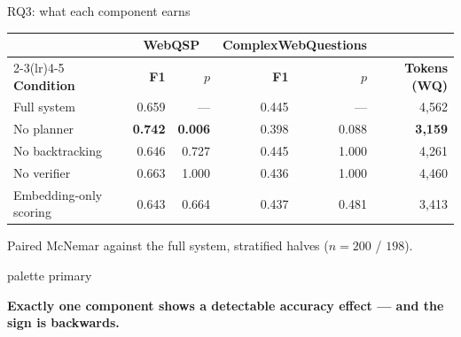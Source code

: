 \documentclass[aspectratio=169,12pt]{beamer}
\newcommand{\takeaway}[1]{%
  \vspace{1.5mm}%
  \begin{beamercolorbox}[wd=\dimexpr\textwidth-4.4mm\relax,sep=2.2mm,
    rounded=true]{palette primary}%
    \color{agrdark}\small\raggedright\textbf{#1}%
  \end{beamercolorbox}}
\begin{document}
\begin{frame}{RQ3: what each component earns}
  \begin{table}
    \small
    \begin{tabular}{@{}lrrrrr@{}}
      \toprule
      & \multicolumn{2}{c}{\textbf{WebQSP}}
      & \multicolumn{2}{c}{\textbf{ComplexWebQuestions}} & \\
      \cmidrule(lr){2-3}\cmidrule(lr){4-5}
      \textbf{Condition} & \textbf{F1} & \textbf{$p$}
                         & \textbf{F1} & \textbf{$p$}
                         & \textbf{Tokens (WQ)} \\
      \midrule
      Full system     & 0.659 & ---   & 0.445 & ---   & 4{,}562 \\
      No planner      & \textbf{0.742} & \alert{\textbf{0.006}}
                      & 0.398 & 0.088 & \textbf{3{,}159} \\
      No backtracking & 0.646 & 0.727 & 0.445 & 1.000 & 4{,}261 \\
      No verifier     & 0.663 & 1.000 & 0.436 & 1.000 & 4{,}460 \\
      Embedding-only scoring & 0.643 & 0.664 & 0.437 & 0.481 & 3{,}413 \\
      \bottomrule
    \end{tabular}
  \end{table}
  {\small Paired McNemar against the full system, stratified halves
  ($n=200$ / $198$).}
  \takeaway{Exactly one component shows a detectable accuracy effect --- and
    the sign is backwards.}
\end{frame}
\end{document}
